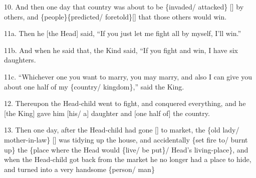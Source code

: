 10. And then one day that country was about to be \{invaded/ attacked\} [] by others,
and \{people\}\{predicted/ foretold\}[] that those others would win.

11a. Then he [the Head] said, ``If you just let me fight all by myself, I'll win.''

11b. And when he said that, the Kind said, ``If you fight and win, I have six daughters.

11c. ``Whichever one you want to marry, you may marry, and also I can give you
about one half of my \{country/ kingdom\},'' said the King.

12. Thereupon the Head-child went to fight, and conquered everything, and he [the
King] gave him [his/ a] daughter and [one half of] the country.

13. Then one day, after the Head-child had gone [] to market, the \{old lady/ mother-in-law\}
[] was tidying up the house, and accidentally \{set fire to/ burnt up\} the \{place
where the Head would \{live/ be put\}/ Head's living-place\}, and when the Head-child
got back from the market he no longer had a place to hide, and turned into a very
handsome \{person/ man\}

